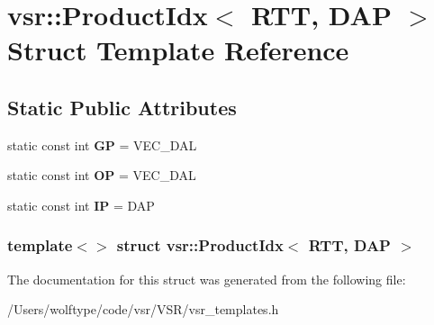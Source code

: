 \hypertarget{structvsr_1_1_product_idx_3_01_r_t_t_00_01_d_a_p_01_4}{\section{vsr\-:\-:Product\-Idx$<$ R\-T\-T, D\-A\-P $>$ Struct Template Reference}
\label{structvsr_1_1_product_idx_3_01_r_t_t_00_01_d_a_p_01_4}
}
\subsection*{Static Public Attributes}
\begin{DoxyCompactItemize}
\item 
\hypertarget{structvsr_1_1_product_idx_3_01_r_t_t_00_01_d_a_p_01_4_a3989e67e6fa87f5dd956a295b55d5fc0}{static const int {\bfseries G\-P} = V\-E\-C\-\_\-\-D\-A\-L}\label{structvsr_1_1_product_idx_3_01_r_t_t_00_01_d_a_p_01_4_a3989e67e6fa87f5dd956a295b55d5fc0}

\item 
\hypertarget{structvsr_1_1_product_idx_3_01_r_t_t_00_01_d_a_p_01_4_acb87759a86c468f7fbf694da890206f8}{static const int {\bfseries O\-P} = V\-E\-C\-\_\-\-D\-A\-L}\label{structvsr_1_1_product_idx_3_01_r_t_t_00_01_d_a_p_01_4_acb87759a86c468f7fbf694da890206f8}

\item 
\hypertarget{structvsr_1_1_product_idx_3_01_r_t_t_00_01_d_a_p_01_4_ad08ec48a8845310fdf3212f283247ade}{static const int {\bfseries I\-P} = D\-A\-P}\label{structvsr_1_1_product_idx_3_01_r_t_t_00_01_d_a_p_01_4_ad08ec48a8845310fdf3212f283247ade}

\end{DoxyCompactItemize}
\subsubsection*{template$<$$>$ struct vsr\-::\-Product\-Idx$<$ R\-T\-T, D\-A\-P $>$}



The documentation for this struct was generated from the following file\-:\begin{DoxyCompactItemize}
\item 
/\-Users/wolftype/code/vsr/\-V\-S\-R/vsr\-\_\-templates.\-h\end{DoxyCompactItemize}
